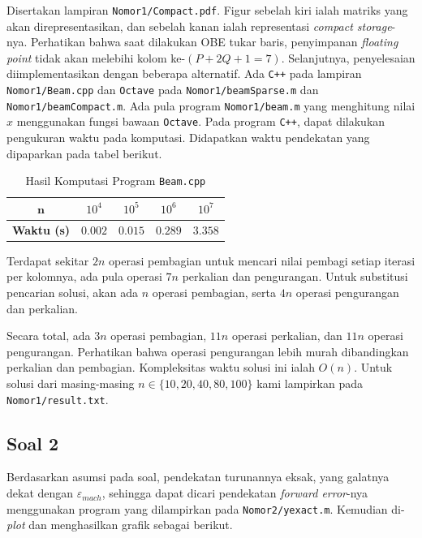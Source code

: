 \documentclass[10pt, a4paper, onecolumn, oneside, final]{report}
\begin{document}
Disertakan lampiran \texttt{Nomor1/Compact.pdf}. Figur sebelah kiri ialah matriks yang akan direpresentasikan, dan sebelah kanan ialah representasi \textit{compact storage}-nya. Perhatikan bahwa saat dilakukan OBE tukar baris, penyimpanan \textit{floating point} tidak akan melebihi kolom ke-$(P+2Q+1 = 7)$. Selanjutnya, penyelesaian diimplementasikan dengan beberapa alternatif. Ada \texttt{C++} pada lampiran \texttt{Nomor1/Beam.cpp} dan \texttt{Octave} pada \texttt{Nomor1/beamSparse.m} dan \texttt{Nomor1/beamCompact.m}. Ada pula program \texttt{Nomor1/beam.m} yang menghitung nilai $x$ menggunakan fungsi bawaan \texttt{Octave}. Pada program \texttt{C++}, dapat dilakukan pengukuran waktu pada komputasi. Didapatkan waktu pendekatan yang dipaparkan pada tabel berikut.

\begin{table}[ht]
\caption{Hasil Komputasi Program \texttt{Beam.cpp}}
\centering
\begin{tabular}{| c | c | c | c | c |}
\hline
$\bm{n}$ & $10^4$ & $10^5$ & $10^6$ & $10^7$\\
\hline
\textbf{Waktu (s)} & $0.002$ & $0.015$  & $0.289$ & $3.358$\\
\hline
\end{tabular}
\label{table:nonlin}
\end{table}

Terdapat sekitar $2n$ operasi pembagian untuk mencari nilai pembagi setiap iterasi per kolomnya, ada pula operasi $7n$ perkalian dan pengurangan. Untuk substitusi pencarian solusi, akan ada $n$ operasi pembagian, serta $4n$ operasi pengurangan dan perkalian. 

Secara total, ada $3n$ operasi pembagian, $11n$ operasi perkalian, dan $11n$ operasi pengurangan. Perhatikan bahwa operasi pengurangan lebih murah dibandingkan perkalian dan pembagian. Kompleksitas waktu solusi ini ialah $O(n)$. Untuk solusi dari masing-masing $n \in \{10, 20, 40, 80, 100\}$ kami lampirkan pada \texttt{Nomor1/result.txt}.

\subsection*{Soal 2}

Berdasarkan asumsi pada soal, pendekatan turunannya eksak, yang galatnya dekat dengan $\varepsilon_{mach}$, sehingga dapat dicari pendekatan \textit{forward error}-nya menggunakan program yang dilampirkan pada \texttt{Nomor2/yexact.m}. Kemudian di-\textit{plot} dan menghasilkan grafik sebagai berikut.
\end{document}

